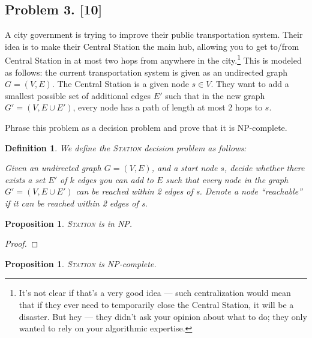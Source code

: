 \documentclass[10pt]{article}
\newtheorem{proposition}[lemma]{Proposition}
\newtheorem{definition}{Definition}
\begin{document}
\subsection*{Problem 3. [10]}
  A city government is trying to improve their public transportation system. Their idea is to make their Central Station the main hub, allowing you to get to/from Central Station in at most two hops from anywhere in the city.\footnote{It's not clear if that's a very good idea --- such centralization would mean that if they ever need to temporarily close the Central Station, it will be a disaster. But hey --- they didn't ask your opinion about what to do; they only wanted to rely on your algorithmic expertise.}
  This is modeled as follows: the current transportation system is given as an undirected graph $G=(V,E)$. The Central Station is a given node $s \in V$. They want to add a smallest possible set of additional edges $E'$ such that in the new graph $G'=(V,E \cup E')$, every node has a path of length at most 2 hops to $s$.

  Phrase this problem as a decision problem and prove that it is NP-complete.

\begin{definition}
  We define the \textsc{Station} decision problem as follows:

  Given an undirected graph \(G = (V, E)\), and a start node \(s\), decide whether there exists a set \(E'\) of \(k\) edges you can add to \(E\) such that every node in the graph \(G' = (V, E \cup E')\) can be reached within 2 edges of s. Denote a node ``reachable'' if it can be reached within 2 edges of s.
\end{definition}

\begin{proposition}
  \textsc{Station} is in NP.
\end{proposition}

\begin{proof}
  
\end{proof}

\begin{proposition}
  \textsc{Station} is NP-complete.
\end{proposition}
\end{document}
